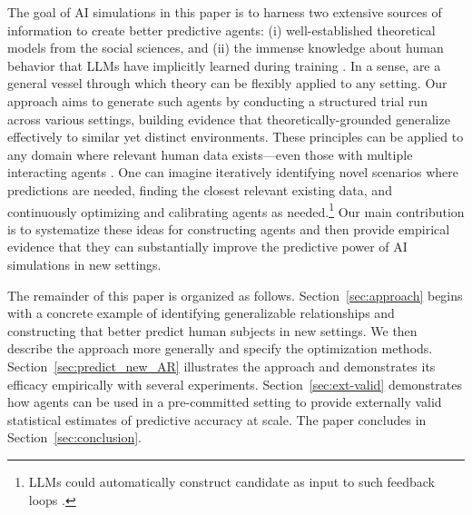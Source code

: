 The goal of AI simulations in this paper is to harness two extensive sources of information to create better predictive agents: (i) well-established theoretical models from the social sciences, and (ii) the immense knowledge about human behavior that LLMs have implicitly learned during training \citep{lindsey2025biology,ameisen2025circuit}.
In a sense,  are a general vessel through which theory can be flexibly applied to any setting.
Our approach aims to generate such agents by conducting a structured trial run across various settings, building evidence that theoretically-grounded  generalize effectively to similar yet distinct environments.
These principles can be applied to any domain where relevant human data exists---even those with multiple interacting agents \citep{Manning2024Automated,qian2025strategicbargaining}.
One can imagine iteratively identifying novel scenarios where predictions are needed, finding the closest relevant existing data, and continuously optimizing and calibrating agents as needed.\footnote{LLMs could automatically construct candidate  as input to such feedback loops \citep{Jackson2025Mixture}.}
Our main contribution is to systematize these ideas for constructing agents and then provide empirical evidence that they can substantially improve the predictive power of AI simulations in new settings.

The remainder of this paper is organized as follows.
Section~\ref{sec:approach} begins with a concrete example of identifying generalizable relationships and constructing  that better predict human subjects in new settings.
We then describe the approach more generally and specify the optimization methods.
Section~\ref{sec:predict_new_AR} illustrates the approach and demonstrates its efficacy empirically with several experiments.
Section~\ref{sec:ext-valid} demonstrates how agents can be used in a pre-committed setting to provide externally valid statistical estimates of predictive accuracy at scale.
The paper concludes in Section~\ref{sec:conclusion}.
